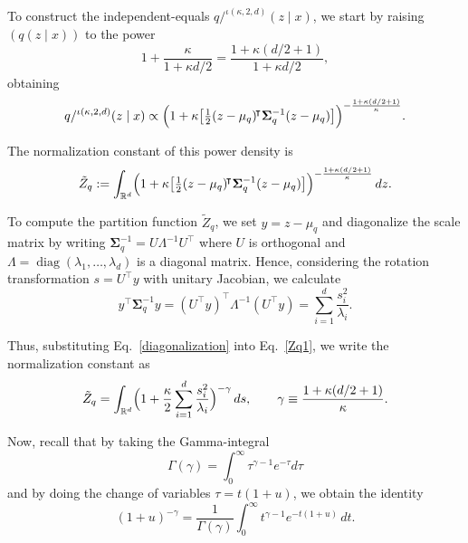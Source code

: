 \documentclass[twoside,11pt]{article}
\renewenvironment{proof}{\par\noindent{\bf Proof\ }}{\hfill\BlackBox\par\vspace{2mm}}
\begin{document}
\begin{proof} 
To construct the independent-equals 
$q/^{\iota(\kappa,2,d)}(z \mid x)$, 
we start by raising $(q(z \mid x))$ to the power
\[
1 + \frac{\kappa}{1+\kappa d/2}
=\frac{1+\kappa(d/2+1)}{1+\kappa d/2},
\]
obtaining
\begin{equation}\label{coupledGaussianPowerBeta}
q/^{\iota(\kappa,2,d)}(z \mid x) \propto
\Bigl(1 + \kappa 
\bigl[\tfrac{1}{2}(z-\mu_q)^{\!\intercal} 
\boldsymbol{\Sigma}_q^{-1} (z-\mu_q)
\bigr]
\Bigr)^{-\frac{1+\kappa(d/2+1)}{\kappa}}.
\end{equation}

The normalization constant of this power density is  
\begin{equation}\label{Zq1}
\tilde Z_q := \int_{\mathbb{R}^d}\Bigl(
1 + \kappa \bigl[\tfrac{1}{2}(z-\mu_q)^{\!\intercal} 
\boldsymbol{\Sigma}_q^{-1} (z-\mu_q)\bigr]
\Bigr)^{-\frac{1+\kappa(d/2+1)}{\kappa}}\, dz.
\end{equation}

To compute the partition function $\tilde Z_q$, we set 
$y = z - \mu_q$ and diagonalize the scale matrix by writing
$\boldsymbol{\Sigma}_q^{-1} = U \Lambda^{-1} U^{\!\intercal}$ 
where $U$ is orthogonal and 
$\Lambda = \operatorname{diag}(\lambda_1,\dots,\lambda_d)$ 
is a diagonal matrix. Hence, considering the rotation transformation 
$s = U^{\!\intercal} y$ with unitary Jacobian, we calculate
\begin{equation}\label{diagonalization}
y^{\!\intercal} \boldsymbol{\Sigma}_q^{-1} y
=(U^{\!\intercal}y)^{\!\intercal} 
\Lambda^{-1} (U^{\!\intercal}y)
=\sum_{i=1}^d \frac{s_i^2}{\lambda_i}.
\end{equation}

Thus, substituting Eq.~\eqref{diagonalization} into Eq.~\eqref{Zq1}, we write the normalization constant as
\begin{equation}\label{Zq2}
\tilde Z_q=\int_{\mathbb{R}^d}\Bigl(
1 + \frac{\kappa}{2}\sum_{i=1}^d \frac{s_i^2}{\lambda_i}\Bigr)^{-\gamma}\, ds,\qquad
\gamma \equiv \frac{1+\kappa(d/2+1)}{\kappa}.
\end{equation}

Now, recall that by taking the Gamma-integral
\[
\Gamma(\gamma)
=
\int_0^\infty \tau^{\gamma-1} e^{-\tau} d\tau
\]
and by doing the change of variables 
$\tau=t(1+u)$, we obtain the identity
\begin{equation}\label{GammaIdentity}
(1+u)^{-\gamma}=\frac{1}{\Gamma(\gamma)}
\int_0^\infty t^{\gamma-1} e^{-t(1+u)}\, dt.
\end{equation}


\end{proof}
\end{document}
